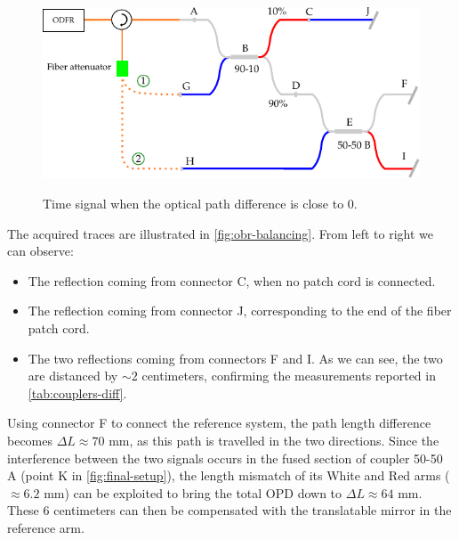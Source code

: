 \begin{figure}[tb]
	\myfloatalign
	{	\includegraphics[width=\linewidth]{gfx/ch3/obr-balancing-setup}}
	\caption{Time signal when the optical path difference is close to 0.}\label{fig:obr-balancing-setup}
\end{figure}

The acquired traces are illustrated in \autoref{fig:obr-balancing}. From left to right we can observe:
\begin{itemize}
	
	\item The reflection coming from connector C, when no patch cord is connected.
	\item The reflection coming from connector J, corresponding to the end of the fiber patch cord. 
	
	\item The two reflections coming from connectors F and I. As we can see, the two are distanced by $\sim 2$ centimeters, confirming the measurements reported in \autoref{tab:couplers-diff}. 
\end{itemize}

Using connector F to connect the reference system, the path length difference becomes $\Delta L \approx 70$ mm, as this path is travelled in the two directions. Since the interference between the two signals occurs in the fused section of coupler 50-50 A (point K in \autoref{fig:final-setup}), the length mismatch of its White and Red arms ($\approx 6.2$ mm) can be exploited to bring the total \ac{OPD} down to $\Delta L \approx 64$ mm. These 6 centimeters can then be compensated with the translatable mirror in the reference arm. 


